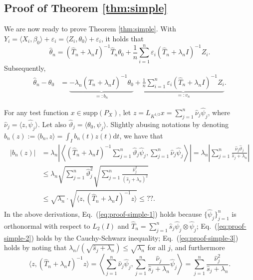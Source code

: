 \documentclass[11pt,a4paper]{article}
\renewcommand{\hat}{\widehat}
\theoremstyle{definition}
\theoremstyle{plain}
\theoremstyle{remark}
\newcommand{\supp}{\mathrm{supp}}
\newcommand{\ud}{\mathrm d}
\begin{document}
\subsection{Proof of Theorem \ref{thm:simple}}

We are now ready to prove Theorem \ref{thm:simple}.
With $Y_i=\langle X_i,\beta_0\rangle+\varepsilon_i = \langle Z_i,\theta_0\rangle+\varepsilon_i$, it holds that
$$
\hat\theta_n = (\hat T_n+\lambda_n I)^{-1}\hat T_n\theta_0 + \frac{1}{n}\sum_{i=1}^n\varepsilon_i (\hat T_n+\lambda_n I)^{-1}Z_i.
$$
Subsequently,
\begin{align}
\hat\theta_n-\theta_0 &= \underbrace{-\lambda_n (\hat T_n+\lambda_n I)^{-1}\theta_0}_{=: b_n} + \underbrace{\frac{1}{n}\sum_{i=1}^n\varepsilon_i(\hat T_n+\lambda_n I)^{-1}Z_i}_{=:v_n}.
\end{align}

For any test function $x\in\supp(P_X)$, let $z=L_{K^{1/2}}x=\sum_{j=1}^{n}\hat\nu_j\hat\psi_j$, where $\hat\nu_j=\langle z,\hat\psi_j\rangle$.
Let also $\hat\vartheta_j = \langle\theta_0,\hat\psi_j\rangle$.
Slightly abusing notations by denoting $b_n(z) := \langle b_n,z\rangle = \int_I b_n(t)z(t)\ud t$, we have that
\begin{align}
\big|b_n(z)\big| &= \lambda_n\left|\left\langle(\hat T_n+\lambda_n I)^{-1}\sum_{j=1}^n\hat\vartheta_j\hat\psi_j, \sum_{j=1}^n\hat\nu_j\hat\psi_j\right\rangle\right|
= \lambda_n \left|\sum_{j=1}^n \frac{\hat\nu_j\hat\vartheta_j}{\hat s_j+\lambda_n}\right|\label{eq:proof-simple-1}\\
&\leq \lambda_n \sqrt{\sum_{j=1}^n\hat\vartheta_j^2}\sqrt{\sum_{j=1}^n\frac{\hat\nu_j^2}{(\hat s_j+\lambda_n)^2}}\label{eq:proof-simple-2}\\
&\leq \sqrt{\lambda_n}\cdot \sqrt{\langle z,(\hat T_n+\lambda_n I)^{-1}z\rangle} \leq ??.\label{eq:proof-simple-3}
\end{align}
In the above derivations, Eq.~(\ref{eq:proof-simple-1}) holds because $\{\hat\psi_j\}_{j=1}^n$ is orthonormal with respect to $L_2(I)$ and $\hat T_n=\sum_{j=1}^n\hat s_j\hat\psi_j\otimes\hat\psi_j$;
Eq.~(\ref{eq:proof-simple-2}) holds by the Cauchy-Schwarz inequality;
Eq.~(\ref{eq:proof-simple-3}) holds by noting that $\lambda_n/(\sqrt{\hat s_j+\lambda_n})\leq\sqrt{\lambda_n}$ for all $j$, and furthermore
$$
\langle z, (\hat T_n+\lambda_n I)^{-1}z\rangle = \left\langle\sum_{j=1}^n\hat\nu_j\hat\psi_j, \sum_{j=1}^n\frac{\hat\nu_j}{\hat s_j+\lambda_n}\hat\psi_j\right\rangle = \sum_{j=1}^n\frac{\hat\nu_j^2}{\hat s_j+\lambda_n}.
$$
\end{document}
